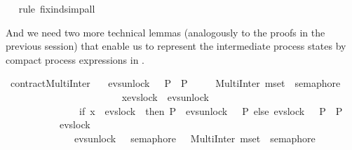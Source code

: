 \begin{isabellebody}
\ \ \isamarkupfalse%
{\isacharparenleft}{\kern0pt}rule\ fix{\isacharunderscore}{\kern0pt}ind{\isacharparenright}{\kern0pt}{\isacharparenleft}{\kern0pt}simp{\isacharunderscore}{\kern0pt}all{\isacharparenright}{\kern0pt}%
\endisatagproof
{\isafoldproof}%
%
\isadelimproof
%
\endisadelimproof
%
\begin{isamarkuptext}%
And we need two more technical lemmas (analogously to the proofs in the previous session)
that enable us to represent the intermediate process states by compact process expressions 
in .%
\end{isamarkuptext}\isamarkuptrue%
\isamarkupfalse%
\ contractMultiInter{}{\isacharprime}{\kern0pt}{\isacharcolon}{\kern0pt}\isanewline
\ \ \ {\isacartoucheopen}evs{\isachardot}{\kern0pt}unlock\ {}\ {\isasymrightarrow}\ P{}\ {\isacharequal}{\kern0pt}\ P{}{\isacartoucheclose}\isanewline
\ \ \ \ \ {\isacartoucheopen}MultiInter\ {\isacharparenleft}{\kern0pt}mset\ {\isacharbrackleft}{\kern0pt}{}{\isachardot}{\kern0pt}{\isachardot}{\kern0pt}{}{\isacharbrackright}{\kern0pt}{\isacharparenright}{\kern0pt}\ semaphore\isanewline
\ \ \ \ \ \ \ \ \ \ \ {\isacharbar}{\kern0pt}{\isacharbar}{\kern0pt}\ \isanewline
\ \ \ \ \ \ \ \ \ \ \ {\isasymbox}x{\isasymin}{\isacharbraceleft}{\kern0pt}evs{\isachardot}{\kern0pt}lock\ {}{\isacharcomma}{\kern0pt}\ evs{\isachardot}{\kern0pt}unlock\ {}{\isacharbraceright}{\kern0pt}\isanewline
\ \ \ \ \ \ \ \ \ \ \ \ \ \ {\isasymrightarrow}\ {\isacharparenleft}{\kern0pt}if\ x\ {\isacharequal}{\kern0pt}\ evs{\isachardot}{\kern0pt}lock\ {}\ then\ P{}\ {\isacharbar}{\kern0pt}{\isacharbar}{\kern0pt}{\isacharbar}{\kern0pt}\ evs{\isachardot}{\kern0pt}unlock\ {}\ {\isasymrightarrow}\ P{}\ else\ evs{\isachardot}{\kern0pt}lock\ {}\ {\isasymrightarrow}\ P{}\ {\isacharbar}{\kern0pt}{\isacharbar}{\kern0pt}{\isacharbar}{\kern0pt}\ P{}{\isacharparenright}{\kern0pt}\ {\isacharequal}{\kern0pt}\isanewline
\ \ \ \ \ \ \ \ \ \ \ evs{\isachardot}{\kern0pt}lock\ {}\ {\isasymrightarrow}\isanewline
\ \ \ \ \ \ \ \ \ \ \ {\isacharparenleft}{\kern0pt}\ \ \ {\isacharparenleft}{\kern0pt}evs{\isachardot}{\kern0pt}unlock\ {}\ {\isasymrightarrow}\ semaphore\ {}\ {\isacharbar}{\kern0pt}{\isacharbar}{\kern0pt}{\isacharbar}{\kern0pt}\ MultiInter\ {\isacharparenleft}{\kern0pt}mset\ {\isacharbrackleft}{\kern0pt}{}{\isachardot}{\kern0pt}{\isachardot}{\kern0pt}{}{\isacharbrackright}{\kern0pt}{\isacharparenright}{\kern0pt}\ semaphore{\isacharparenright}{\kern0pt}\ \isanewline

\end{isabellebody}
